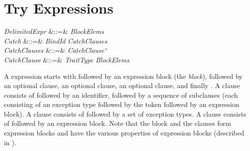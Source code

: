 %
%
%
%

\section{Try Expressions}


\begin{Grammar}
\emph{DelimitedExpr}
&::=&  \emph{BlockElems} 
  \\
\emph{Catch} &::=&  \emph{BindId} \emph{CatchClauses}\\

\emph{CatchClauses} &::=& \emph{CatchClause}$^+$\\

\emph{CatchClause} &::=& \emph{TraitType} \EXP{\Rightarrow} \emph{BlockElems} \\
\end{Grammar}


A  expression starts with 
followed by an expression block (the \emph{ block}),
followed by an optional  clause, an optional 
clause, an optional  clause, and finally
.  A  clause consists of
 followed by an identifier, followed by a sequence
of subclauses (each consisting of an exception type followed by the token
\EXP{\Rightarrow} followed by an expression block).
A  clause consists of 
followed by a set of exception types.
A  clause consists of 
followed by an expression block.
Note that the  block and the clauses
form expression blocks and have the various properties of
expression blocks (described in ).



